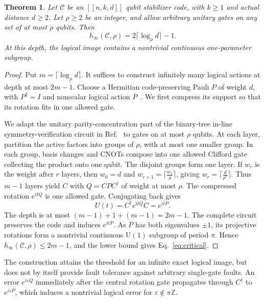 \documentclass[aps,prl,reprint,notitlepage,nofootinbib,nobibnotes]{revtex4-2}
\newtheorem{theorem}{Theorem}
\newcommand{\id}{I}
\begin{document}
\begin{samepage}
\begin{theorem}\label{cor:critical}
Let \(\mathcal C\) be an \([[n,k,d]]\) qubit stabilizer code,
with \(k\ge1\) and actual distance \(d\ge2\). Let \(\rho\ge2\) be an
integer, and allow arbitrary unitary gates on any set of at most \(\rho\)
qubits. Then
\begin{equation}\label{eq:critical}
 h_\infty(\mathcal C,\rho)=2\lceil\log_{\rho} d\rceil-1.
\end{equation}
At this depth, the logical image contains a nontrivial continuous
one-parameter subgroup.
\end{theorem}
\end{samepage}

\begin{proof}
Put \(m=\lceil\log_\rho d\rceil\). It suffices to construct infinitely many
logical actions at depth at most \(2m-1\).
Choose a Hermitian code-preserving Pauli \(P\) of weight \(d\), with
\(P^2=\id\) and nonscalar logical action
\(\overline P\)~\cite[Sec.~3.2]{GottesmanStabilizer}.
We first compress its support so that its rotation fits in one allowed
gate.

We adapt the unitary parity-concentration part of the binary-tree
in-line symmetry-verification circuit in
Ref.~\cite[Sec.~IV and Fig.~2(a)]{BonetMonroig}
to gates on at most \(\rho\) qubits.
At each layer, partition the active factors into groups of \(\rho\),
with at most one smaller group. In each group, basis changes and CNOTs
compose into one allowed Clifford gate collecting the product onto
one qubit. The disjoint groups form one layer.
If \(w_r\) is the weight after \(r\) layers, then
\(w_0=d\) and \(w_{r+1}=\lceil\frac{w_r}{\rho}\rceil\), giving
\(w_r=\lceil\frac{d}{\rho^r}\rceil\).
Thus \(m-1\) layers yield \(C\) with \(Q=CPC^\dagger\) of weight at
most \(\rho\). 
The compressed rotation \(e^{itQ}\) is one allowed gate.
Conjugating back gives
\begin{equation}\label{eq:pauli-family}
 U(t)=C^\dagger e^{itQ}C=e^{itP}.
\end{equation}
The depth is at most \((m-1)+1+(m-1)=2m-1\).
The complete circuit preserves the code and induces
\(e^{it\overline P}\). As \(\overline P\) has both eigenvalues
\(\pm1\), its projective rotations form a nontrivial continuous
\(\mathrm U(1)\) subgroup of period \(\pi\).
Hence \(h_\infty(\mathcal C,\rho)\le2m-1\), and the lower bound gives
Eq.~\eqref{eq:critical}.
\end{proof}
The construction attains the threshold for an infinite exact logical image,
but does not by itself provide fault tolerance against arbitrary single-gate faults.
An error \(e^{i\varepsilon Q}\) immediately after the central rotation gate
propagates through \(C^\dagger\) to \(e^{i\varepsilon P}\), which induces
a nontrivial logical error for \(\varepsilon\notin\pi\mathbb Z\).
\end{document}
